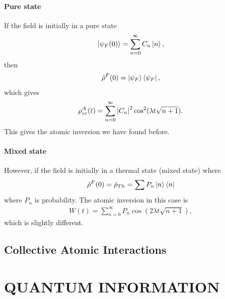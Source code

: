 \documentclass{book}
\theoremstyle{definition}
\begin{document}
\subsubsection{Pure state}
If the field is initially in a pure state
\begin{align}
\ket{\psi_F(0)} = \sum^\infty_{n=0}C_n\ket{n},
\end{align}
then
\begin{align}
\hat{\rho}^F(0) = \ket{\psi_F}\bra{\psi_F},
\end{align}
which gives
\begin{align}
\rho^A_{ee}(t) = \sum^\infty_{n=0}\abs{C_n}^2\cos^2(\lambda t \sqrt{n+1}).
\end{align}
This gives the atomic inversion we have found before. 
\subsubsection{Mixed state}
However, if the field is initially in a thermal state (mixed state) where
\begin{align}
\hat{\rho}^F(0) = \hat{\rho}_{Th} = \sum P_n\ket{n}\bra{n}
\end{align}
where $P_n$ is probability. The atomic inversion in this case is
\begin{align}
W(t) = \sum^\infty_{n=0}P_n \cos(2\lambda t\sqrt{n+1}),
\end{align}
which is slightly different. 



















\newpage

\section{Collective Atomic Interactions}



\newpage


\chapter{QUANTUM INFORMATION}
\end{document}
